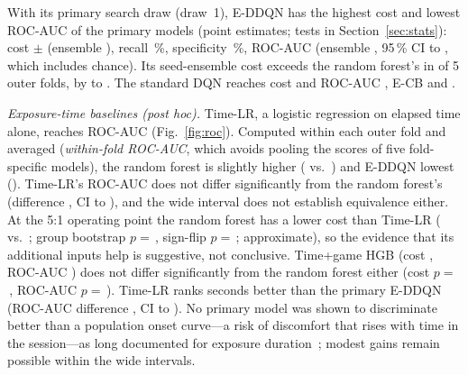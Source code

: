 With its primary search draw (draw~1), E-DDQN has the highest cost and lowest ROC-AUC of the \nModels{} primary models (point estimates; tests in Section~\ref{sec:stats}): cost \EDDQNCostCostMean$\pm$\EDDQNCostCostSD{} (ensemble \PHEnsEDDQNCost), recall \EDDQNCostRecallMean\,\%, specificity \EDDQNCostSpecMean\,\%, ROC-AUC \EDDQNCostRocAucMean{} (ensemble \EDDQNCostRocAucEns, 95\,\% CI \EDDQNCIRocAucLo{} to \EDDQNCIRocAucHi, which includes chance). Its seed-ensemble cost exceeds the random forest's in \PHFoldsEDDQNWorseRF{} of 5 outer folds, by \PHFoldDiffEDDQNRFMin{} to \PHFoldDiffEDDQNRFMax. The standard DQN reaches cost \DQNCostCostMean{} and ROC-AUC \DQNCostRocAucMean, E-CB \ECBCostCostMean{} and \ECBCostRocAucMean.

\begin{table}[t]
\centering
\caption{Session-grouped comparison (rule D1; \nSamplesEval{} outer-test samples; recall, specificity, balanced accuracy in \%). Left: mean~$\pm$~SD over five seeds. Right: seed ensemble, used for all paired tests and confidence intervals; FN and FP are exact counts. Bold: proposed model and lowest primary cost. HGB, logistic regression and the post-hoc baselines are deterministic (SD = 0). Further metrics: Supplementary Sec.~S3.1.}
\label{tab:main}
\resizebox{\textwidth}{!}{}
\end{table}

\emph{Exposure-time baselines (post hoc).} Time-LR, a logistic regression on elapsed time alone, reaches ROC-AUC \PHTimeLRRocAucMean{} (Fig.~\ref{fig:roc}). Computed within each outer fold and averaged (\emph{within-fold ROC-AUC}, which avoids pooling the scores of five fold-specific models), the random forest is slightly higher (\PHWfRFAuc{} vs.\ \PHWfTimeLRAuc) and E-DDQN lowest (\PHWfEDDQNAuc). Time-LR's ROC-AUC does not differ significantly from the random forest's (difference \PHTimeLRvsRFAuc, CI \PHTimeLRvsRFAucLow{} to \PHTimeLRvsRFAucHigh), and the wide interval does not establish equivalence either. At the 5:1 operating point the random forest has a lower cost than Time-LR (\PHEnsRFCost{} vs.\ \PHEnsTimeLRCost; group bootstrap $p=$\,\PHTimeLRvsRFCostP, sign-flip $p=$\,\PHSfTimeLRvsRFP; approximate), so the evidence that its additional inputs help is suggestive, not conclusive. Time+game HGB (cost \PHTimeHGBCostMean, ROC-AUC \PHTimeHGBRocAucMean) does not differ significantly from the random forest either (cost $p=$\,\PHTimeHGBvsRFCostP, ROC-AUC $p=$\,\PHTimeHGBvsRFAucP). Time-LR ranks seconds better than the primary E-DDQN (ROC-AUC difference \PHTimeLRvsEDDQNAuc, CI \PHTimeLRvsEDDQNAucLow{} to \PHTimeLRvsEDDQNAucHigh). No primary model was shown to discriminate better than a population onset curve---a risk of discomfort that rises with time in the session---as long documented for exposure duration~\cite{kennedy2000duration}; modest gains remain possible within the wide intervals.

